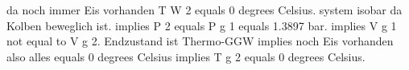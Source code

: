 da noch immer Eis vorhanden T W 2 equals 0 degrees Celsius.  
system isobar da Kolben beweglich ist.  
implies P 2 equals P g 1 equals 1.3897 bar. implies V g 1 not equal to V g 2.  
Endzustand ist Thermo-GGW implies noch Eis vorhanden also alles equals 0 degrees Celsius implies T g 2 equals 0 degrees Celsius.